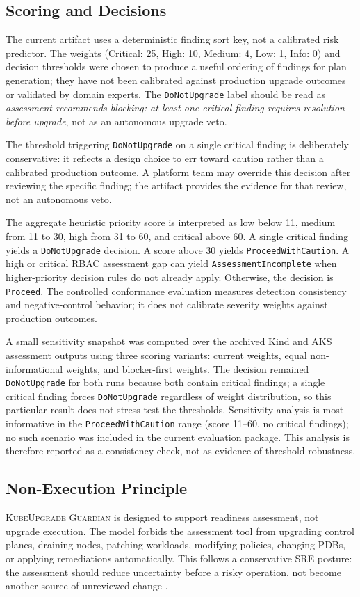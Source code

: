 \documentclass[10pt,journal]{IEEEtran}
\newcommand{\tool}{\textsc{KubeUpgrade Guardian}}
\newcommand{\code}[1]{\texttt{#1}}
\begin{document}
\subsection{Scoring and Decisions}
The current artifact uses a deterministic finding sort key, not a calibrated risk predictor. The weights (Critical: 25, High: 10, Medium: 4, Low: 1, Info: 0) and decision thresholds were chosen to produce a useful ordering of findings for plan generation; they have not been calibrated against production upgrade outcomes or validated by domain experts. The \code{DoNotUpgrade} label should be read as \emph{assessment recommends blocking: at least one critical finding requires resolution before upgrade}, not as an autonomous upgrade veto.

The threshold triggering \code{DoNotUpgrade} on a single critical finding is deliberately conservative: it reflects a design choice to err toward caution rather than a calibrated production outcome. A platform team may override this decision after reviewing the specific finding; the artifact provides the evidence for that review, not an autonomous veto.

The aggregate heuristic priority score is interpreted as low below 11, medium from 11 to 30, high from 31 to 60, and critical above 60. A single critical finding yields a \code{DoNotUpgrade} decision. A score above 30 yields \code{ProceedWithCaution}. A high or critical RBAC assessment gap can yield \code{AssessmentIncomplete} when higher-priority decision rules do not already apply. Otherwise, the decision is \code{Proceed}. The controlled conformance evaluation measures detection consistency and negative-control behavior; it does not calibrate severity weights against production outcomes.

A small sensitivity snapshot was computed over the archived Kind and AKS assessment outputs using three scoring variants: current weights, equal non-informational weights, and blocker-first weights. The decision remained \code{DoNotUpgrade} for both runs because both contain critical findings; a single critical finding forces \code{DoNotUpgrade} regardless of weight distribution, so this particular result does not stress-test the thresholds. Sensitivity analysis is most informative in the \code{ProceedWithCaution} range (score 11--60, no critical findings); no such scenario was included in the current evaluation package. This analysis is therefore reported as a consistency check, not as evidence of threshold robustness.

\subsection{Non-Execution Principle}
\tool{} is designed to support readiness assessment, not upgrade execution. The model forbids the assessment tool from upgrading control planes, draining nodes, patching workloads, modifying policies, changing PDBs, or applying remediations automatically. This follows a conservative SRE posture: the assessment should reduce uncertainty before a risky operation, not become another source of unreviewed change \cite{beyer2016,nygard2018}.
\end{document}
